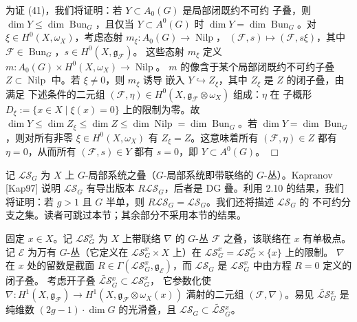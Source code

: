 为证 (41)，我们将证明：若 $Y\subset A_0(G)$ 是局部闭既约不可约
子叠，则 $\dim Y\le\dim\operatorname{Bun}_G$，且仅当
$Y\subset A^{0}(G)$ 时 $\dim Y=\dim\operatorname{Bun}_G$。对
$\xi\in H^0(X,\omega_X)$，考虑态射
$m_\xi:A_0(G)\to\operatorname{Nilp}$，
$(\mathcal{F},s)\mapsto(\mathcal{F},s\xi)$，其中 $\mathcal{F}\in
\operatorname{Bun}_G$，$s\in H^0(X,\mathfrak{g}_{\mathcal{F}})$。
这些态射%
$m_\xi$ 定义 $m:A_0(G)\times H^0(X,\omega_X)\to\operatorname{Nilp}$。
$m$ 的像含于某个局部闭既约不可约子叠
$Z\subset\operatorname{Nilp}$ 中。若 $\xi\ne 0$，则 $m_\xi$ 诱导
嵌入 $Y\hookrightarrow Z_\xi$，其中 $Z_\xi$ 是 $Z$ 的闭子叠，由满足
下述条件的二元组 $(\mathcal{F},\eta)\in
H^0(X,\mathfrak{g}_{\mathcal{F}}\otimes\omega_X)$ 组成：$\eta$ 在
子概形 $D_\xi:=\{x\in X\mid\xi(x)=0\}$ 上的限制为零。故
$\dim Y\le\dim Z_\xi\le\dim Z\le\dim\operatorname{Nilp}
=\dim\operatorname{Bun}_G$。若
$\dim Y=\dim\operatorname{Bun}_G$，则对所有非零
$\xi\in H^0(X,\omega_X)$ 有 $Z_\xi=Z$。这意味着所有
$(\mathcal{F},\eta)\in Z$ 都有 $\eta=0$，从而所有
$(\mathcal{F},s)\in Y$ 都有 $s=0$，即 $Y\subset A^{0}(G)$。
\hfill$\Box$

 记 $\mathcal{LS}_G$ 为 $X$ 上
$G$-局部系统之叠（$G$-局部系统即带联络的 $G$-丛）。Kapranov
[Kap97] 说明 $\mathcal{LS}_G$ 有导出版本 $R\mathcal{LS}_G$，后者是
DG 叠。利用 2.10 的结果，我们将证明：若 $g>1$ 且 $G$ 半单，则
$R\mathcal{LS}_G=\mathcal{LS}_G$。我们还将描述 $\mathcal{LS}_G$ 的
不可约分支之集。读者可跳过本节；其余部分不采用本节的结果。

 固定 $x\in X$。记 $\mathcal{LS}_G^x$ 为 $X$ 上带联络
$\nabla$ 的 $G$-丛 $\mathcal{F}$ 之叠，该联络在 $x$ 有单极点。
记 $\mathcal{E}$ 为万有 $G$-丛（它定义在
$\mathcal{LS}_G^x\times X$ 上）在
$\mathcal{LS}_G^x=\mathcal{LS}_G^x\times\{x\}$ 上的限制。
$\nabla$ 在 $x$ 处的留数是截面
$R\in\Gamma(\mathcal{LS}_G^x,\mathfrak{g}_{\mathcal{E}})$，而
$\mathcal{LS}_G$ 是 $\mathcal{LS}_G^x$ 中由方程 $R=0$ 定义的闭子叠。
考虑开子叠 $\widetilde{\mathcal{LS}}{}_G^x\subset\mathcal{LS}_G^x$，
它参数化使 $\nabla:H^1(X,\mathfrak{g}_{\mathcal{F}})\to
H^1(X,\mathfrak{g}_{\mathcal{F}}\otimes\omega_X(x))$ 满射的二元组
$(\mathcal{F},\nabla)$。易见 $\widetilde{\mathcal{LS}}{}_G^x$ 是
纯维数 $(2g-1)\cdot\dim G$ 的光滑叠，且
$\mathcal{LS}_G\subset\widetilde{\mathcal{LS}}{}_G^x$。

